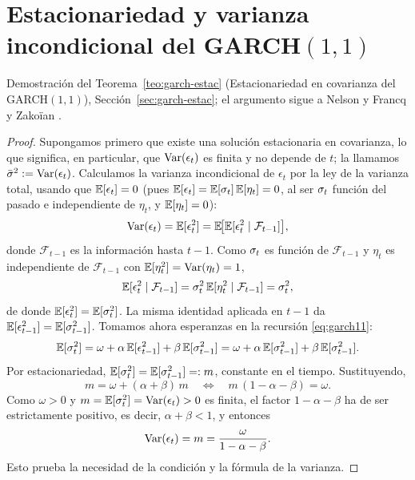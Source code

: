 \section{Estacionariedad y varianza incondicional del GARCH$(1,1)$}
\label{anx:garch-estac}

Demostración del Teorema~\ref{teo:garch-estac} (Estacionariedad en covarianza del GARCH$(1,1)$), Sección~\ref{sec:garch-estac}; el argumento sigue a Nelson \cite{nelson1990} y Francq y Zakoïan \cite{francqzakoian2019}.

\begin{proof}
Supongamos primero que existe una solución estacionaria en covarianza, lo que significa, en particular, que $\operatorname{Var}(\epsilon_t)$ es finita y no depende de $t$; la llamamos $\bar{\sigma}^2 := \operatorname{Var}(\epsilon_t)$. Calculamos la varianza incondicional de $\epsilon_t$ por la ley de la varianza total, usando que $\mathbb{E}[\epsilon_t] = 0$ (pues $\mathbb{E}[\epsilon_t] = \mathbb{E}[\sigma_t]\,\mathbb{E}[\eta_t] = 0$, al ser $\sigma_t$ función del pasado e independiente de $\eta_t$, y $\mathbb{E}[\eta_t]=0$):
\[
\operatorname{Var}(\epsilon_t) = \mathbb{E}[\epsilon_t^2] = \mathbb{E}\!\big[\mathbb{E}[\epsilon_t^2 \mid \mathcal{F}_{t-1}]\big],
\]
donde $\mathcal{F}_{t-1}$ es la información hasta $t-1$. Como $\sigma_t$ es función de $\mathcal{F}_{t-1}$ y $\eta_t$ es independiente de $\mathcal{F}_{t-1}$ con $\mathbb{E}[\eta_t^2] = \operatorname{Var}(\eta_t) = 1$,
\[
\mathbb{E}[\epsilon_t^2 \mid \mathcal{F}_{t-1}] = \sigma_t^2\, \mathbb{E}[\eta_t^2 \mid \mathcal{F}_{t-1}] = \sigma_t^2,
\]
de donde $\mathbb{E}[\epsilon_t^2] = \mathbb{E}[\sigma_t^2]$. La misma identidad aplicada en $t-1$ da $\mathbb{E}[\epsilon_{t-1}^2] = \mathbb{E}[\sigma_{t-1}^2]$. Tomamos ahora esperanzas en la recursión \eqref{eq:garch11}:
\[
\mathbb{E}[\sigma_t^2] = \omega + \alpha\, \mathbb{E}[\epsilon_{t-1}^2] + \beta\, \mathbb{E}[\sigma_{t-1}^2]
= \omega + \alpha\, \mathbb{E}[\sigma_{t-1}^2] + \beta\, \mathbb{E}[\sigma_{t-1}^2].
\]
Por estacionariedad, $\mathbb{E}[\sigma_t^2] = \mathbb{E}[\sigma_{t-1}^2] =: m$, constante en el tiempo. Sustituyendo,
\[
m = \omega + (\alpha + \beta)\, m
\quad\Longleftrightarrow\quad
m\,(1 - \alpha - \beta) = \omega.
\]
Como $\omega > 0$ y $m = \mathbb{E}[\sigma_t^2] = \operatorname{Var}(\epsilon_t) > 0$ es finita, el factor $1 - \alpha - \beta$ ha de ser estrictamente positivo, es decir, $\alpha + \beta < 1$, y entonces
\[
\operatorname{Var}(\epsilon_t) = m = \frac{\omega}{1 - \alpha - \beta}.
\]
Esto prueba la necesidad de la condición y la fórmula de la varianza.


\end{proof}
